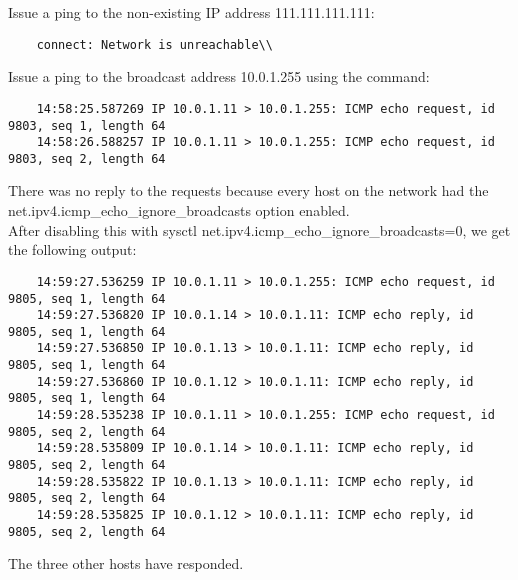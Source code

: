 
Issue a ping to the non-existing IP address 111.111.111.111:\\
   \begin{lstlisting}  
    connect: Network is unreachable\\
\end{lstlisting}  
Issue a ping to the broadcast address 10.0.1.255 using the command:
\begin{lstlisting}  
    14:58:25.587269 IP 10.0.1.11 > 10.0.1.255: ICMP echo request, id 9803, seq 1, length 64
    14:58:26.588257 IP 10.0.1.11 > 10.0.1.255: ICMP echo request, id 9803, seq 2, length 64
\end{lstlisting}  
    There was no reply to the requests because every host on the network had the net.ipv4.icmp\_echo\_ignore\_broadcasts option enabled.\\
After disabling this with sysctl net.ipv4.icmp\_echo\_ignore\_broadcasts=0, we get the following output:
\begin{lstlisting}	  
	14:59:27.536259 IP 10.0.1.11 > 10.0.1.255: ICMP echo request, id 9805, seq 1, length 64
	14:59:27.536820 IP 10.0.1.14 > 10.0.1.11: ICMP echo reply, id 9805, seq 1, length 64
	14:59:27.536850 IP 10.0.1.13 > 10.0.1.11: ICMP echo reply, id 9805, seq 1, length 64
	14:59:27.536860 IP 10.0.1.12 > 10.0.1.11: ICMP echo reply, id 9805, seq 1, length 64
	14:59:28.535238 IP 10.0.1.11 > 10.0.1.255: ICMP echo request, id 9805, seq 2, length 64
	14:59:28.535809 IP 10.0.1.14 > 10.0.1.11: ICMP echo reply, id 9805, seq 2, length 64
	14:59:28.535822 IP 10.0.1.13 > 10.0.1.11: ICMP echo reply, id 9805, seq 2, length 64
	14:59:28.535825 IP 10.0.1.12 > 10.0.1.11: ICMP echo reply, id 9805, seq 2, length 64
\end{lstlisting}

The three other hosts have responded.
